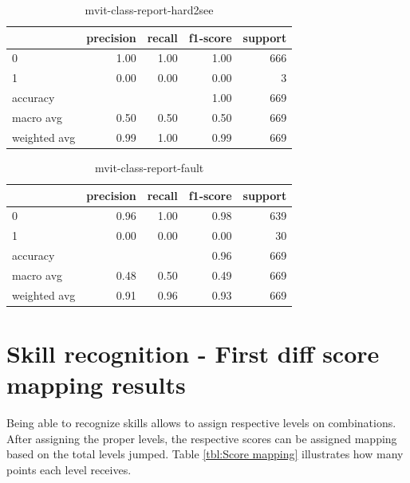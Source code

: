 \begin{table}[h!]
    \begin{tabular}{|l|r|r|r|r|}
                \hline & precision &   recall & f1-score &  support \\ \hline
                0 &      1.00 &     1.00 &     1.00 &      666 \\
                1 &      0.00 &     0.00 &     0.00 &        3 \\ \hline
         accuracy &           &          &     1.00 &      669 \\
        macro avg &      0.50 &     0.50 &     0.50 &      669 \\
     weighted avg &      0.99 &     1.00 &     0.99 &      669 \\

         \hline
    \end{tabular}
    \caption[Hard to see class report]{mvit-class-report-hard2see}
    \label{tbl:mvit-class-report-hard2see}
\end{table}

\begin{table}[h!]
    \begin{tabular}{|l|r|r|r|r|}
                \hline & precision &   recall & f1-score &  support \\ \hline
                0 &      0.96 &     1.00 &      0.98 &       639 \\
                1 &      0.00 &     0.00 &      0.00 &        30 \\ \hline
         accuracy &           &          &      0.96 &       669 \\
        macro avg &      0.48 &     0.50 &      0.49 &       669 \\
     weighted avg &      0.91 &     0.96 &      0.93 &       669 \\
         \hline
    \end{tabular}
    \caption[Fault class report]{mvit-class-report-fault}
    \label{tbl:mvit-class-report-fault}
\end{table}


\section{Skill recognition - First diff score mapping results}
\label{results:score}

Being able to recognize skills allows to assign respective levels on combinations. After assigning the proper levels, the respective scores can be assigned mapping based on the total levels jumped. Table \ref{tbl:Score mapping} illustrates how many points each level receives.

